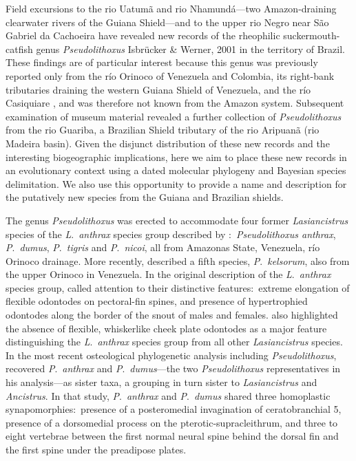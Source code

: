 \documentclass[12pt]{article}
\begin{document}
Field excursions to the rio Uatumã and rio Nhamundá---two Amazon-draining clearwater rivers of the Guiana Shield---and to the upper rio Negro near São Gabriel da Cachoeira have revealed new records of the rheophilic suckermouth-catfish genus \emph{Pseudolithoxus} Isbrücker \& Werner, 2001 in the territory of Brazil. %
These findings are of particular interest because this genus was previously reported only from the río Orinoco of Venezuela and Colombia, its right-bank tributaries draining the western Guiana Shield of Venezuela, and the río Casiquiare \citep{Armbruster2000,Lujan2011kelsorum}, and was therefore not known from the Amazon system. %
Subsequent examination of museum material revealed a further collection of \emph{Pseudolithoxus} from the rio Guariba, a Brazilian Shield tributary of the rio Aripuanã (rio Madeira basin). %
Given the disjunct distribution of these new records and the interesting biogeographic implications, here we aim to place these new records in an evolutionary context using a dated molecular phylogeny and Bayesian species delimitation. %
We also use this opportunity to provide a name and description for the putatively new species from the Guiana and Brazilian shields.

The genus \emph{Pseudolithoxus} was erected to accommodate four former \emph{Lasiancistrus} species of the \emph{L}.\ \emph{anthrax} species group described by \citet{Armbruster2000}:\ \emph{Pseudolithoxus anthrax}, \emph{P}.\ \emph{dumus}, \emph{P}.\ \emph{tigris} and \emph{P}.\ \emph{nicoi}, all from Amazonas State, Venezuela, río Orinoco drainage. %
More recently, \citet{Lujan2011kelsorum} described a fifth species, \emph{P}.\ \emph{kelsorum}, also from the upper Orinoco in Venezuela. %
In the original description of the \emph{L}.\ \emph{anthrax} species group, \citet{Armbruster2000} called attention to their distinctive features:\ extreme elongation of flexible odontodes on pectoral-fin spines, and presence of hypertrophied odontodes along the border of the snout of males and females. %
\citet{Armbruster2000} also highlighted the absence of flexible, whiskerlike cheek plate odontodes as a major feature distinguishing the \emph{L}.\ \emph{anthrax} species group from all other \emph{Lasiancistrus} species. %
In the most recent osteological phylogenetic analysis including \emph{Pseudolithoxus}, \citet{Armbruster2008} recovered \emph{P}.\ \emph{anthrax} and \emph{P}.\ \emph{dumus}---the two \emph{Pseudolithoxus} representatives in his analysis---as sister taxa, a grouping in turn sister to \emph{Lasiancistrus} and \emph{Ancistrus}. %
In that study, \emph{P}.\ \emph{anthrax} and \emph{P}.\ \emph{dumus} shared three homoplastic synapomorphies:\ presence of a posteromedial invagination of ceratobranchial 5, presence of a dorsomedial process on the pterotic-supracleithrum, and three to eight vertebrae between the first normal neural spine behind the dorsal fin and the first spine under the preadipose plates.%
\end{document}
